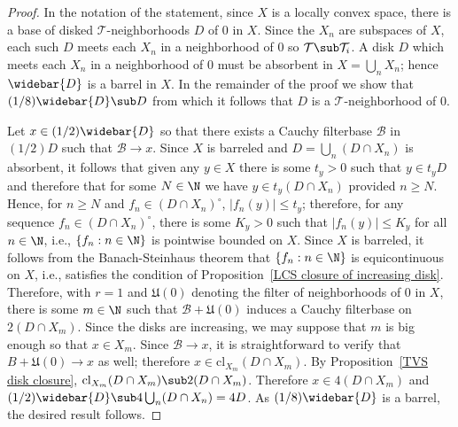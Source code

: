 \begin{proof}
In the notation of the statement, since $X$ is a locally convex space, there is a base of disked $\mathcal{T}$-neighborhoods $D$ of $0$ in $X$. Since the $X_n$ are subspaces of $X$, each such $D$ meets each $X_n$ in a neighborhood of $0$ so $\mathcal{T}\sub\mathcal{T}_i$. A disk $D$ which meets each $X_n$ in a neighborhood of $0$ must be absorbent in $X=\bigcup_nX_n$; hence $\widebar{D}$ is a barrel in $X$. In the remainder of the proof we show that $(1/8)\widebar{D}\sub D$ from which it follows that $D$ is a $\mathcal{T}$-neighborhood of $0$.\par
Let $x\in(1/2)\widebar{D}$ so that there exists a Cauchy filterbase $\mathcal{B}$ in $(1/2)D$ such that $\mathcal{B}\to x$. Since $X$ is barreled and $D=\bigcup_n(D\cap X_n)$ is absorbent, it follows that given any $y\in X$ there is some $t_y>0$ such that $y\in t_yD$ and therefore that for some $N\in\N$ we have $y\in t_y(D\cap X_n)$ provided $n\geq N$. Hence, for $n\geq N$ and $f_n\in(D\cap X_n)^\circ$, $|f_n(y)|\leq t_y$; therefore, for any sequence $f_n\in (D\cap X_n)^\circ$, there is some $K_y>0$ such that $|f_n(y)|\leq K_y$ for all $n\in\N$, i.e., $\{f_n:n\in\N\}$ is pointwise bounded on $X$. Since $X$ is barreled, it follows from the Banach-Steinhaus theorem that $\{f_n:n\in\N\}$ is equicontinuous on $X$, i.e., satisfies the condition of Proposition~\ref{LCS closure of increasing disk}. Therefore, with $r=1$ and $\mathfrak{U}(0)$ denoting the filter of neighborhoods of $0$ in $X$, there is some $m\in\N$ such that $\mathcal{B}+\mathfrak{U}(0)$ induces a Cauchy filterbase on $2(D\cap X_m)$. Since the disks are increasing, we may suppose that $m$ is big enough so that $x\in X_m$. Since $\mathcal{B}\to x$, it is straightforward to verify that $B+\mathfrak{U}(0)\to x$ as well; therefore $x\in\mathrm{cl}_{X_m}(D\cap X_m)$. By Proposition~\ref{TVS disk closure}, $\mathrm{cl}_{X_m}(D\cap X_m)\sub 2(D\cap X_m)$. Therefore $x\in 4(D\cap X_m)$ and $(1/2)\widebar{D}\sub 4\bigcup_n(D\cap X_n)=4D$. As $(1/8)\widebar{D}$ is a barrel, the desired result follows.
\end{proof}
